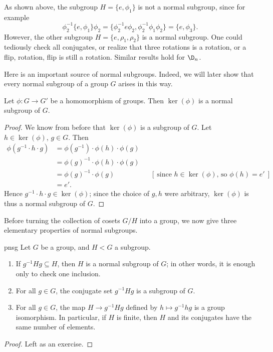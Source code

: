 \documentclass[math1530-lecture-notes]{subfiles}
\begin{document}
\begin{example}
  As shown above, the subgroup $H=\{ e,\phi_1 \}$ is not a normal subgroup, since for example \[
    \phi_2^{-1}\{ e,\phi_1 \}\phi_2=\{ \phi_2^{-1}e\phi_2,\phi_2^{-1}\phi_1\phi_2 \}=\{ e,\phi_3 \}
  .\] However, the other subgroup $H=\{ e,\rho_1,\rho_2 \}$ is a normal subgroup. One could
  tediously check all conjugates, or realize that three rotations is a rotation, or a flip,
  rotation, flip is still a rotation. Similar results hold for $\D_n$.
\end{example}

Here is an important source of normal subgroups. Indeed, we will later show that every normal
subgroup of a group $G$ arises in this way.
\begin{proposition}
  Let $\phi:G\to G'$ be a homomorphism of groups. Then $\ker{(\phi)}$ is a normal subgroup of $G$.
\end{proposition}
\begin{proof}[Proof]
  We know from before that $\ker{(\phi)}$ is a subgroup of $G$. Let $h\in \ker{(\phi)}$, $g\in G$.
  Then
  \begin{align*}
    \phi(g^{-1}\cdot h\cdot g)&= \phi(g^{-1}) \cdot \phi(h)\cdot \phi(g)\\
                              &=\phi(g)^{-1}\cdot \phi(h)\cdot \phi(g)\\
                              &=\phi(g)^{-1}\cdot \phi(g) && [~\text{since $h\in \ker{(\phi)}$, so
                              $\phi(h)=e'$}~]\\
                              &= e'
  .\end{align*}
  Hence $g^{-1}\cdot h\cdot g\in \ker{(\phi)}$; since the choice of $g,h$ were arbitrary,
  $\ker{(\phi)}$ is thus a normal subgroup of $G$.
\end{proof}

Before turning the collection of cosets $G / H$ into a group, we now give three elementary
properties of normal subgroups. 
\begin{proposition}{pnsg}
  Let $G$ be a group, and $H < G$ a subgroup.
  \begin{enumerate}
    \item If $g^{-1}Hg\subseteq H$, then $H$ is a normal subgroup of $G$; in other words, it is
      enough only to check one inclusion.
    \item For all $g\in G$, the conjugate set $g^{-1}Hg$ is a subgroup of $G$.
    \item For all $g\in G$, the map $H\to g^{-1}Hg$ defined by $h\mapsto g^{-1}hg$ is a group
      isomorphism. In particular, if $H$ is finite, then $H$ and its conjugates have the same number
      of elements.
  \end{enumerate}
\end{proposition}
\begin{proof}[Proof]
  Left as an exercise.
\end{proof}
\end{document}
